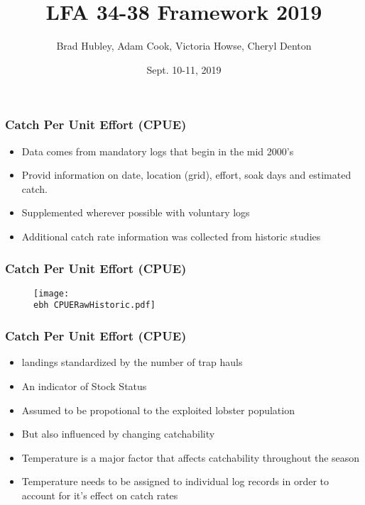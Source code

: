 \documentclass{beamer}
\title[LFA 34-38]{LFA 34-38 Framework 2019}
\author[Hubley, Cook, Howse and Denton]{Brad Hubley, Adam Cook, Victoria Howse, Cheryl Denton}
\institute[DFO]{Science Branch, Fisheries and Oceans Canada}
\date{Sept. 10-11, 2019}
\newcommand{\ebh}{\string~/bio.data/bio.lobster/figures/LFA3438Framework2019/} %
\begin{document}
 
\frame{\titlepage}
 




\begin{frame}
\frametitle{Catch Per Unit Effort (CPUE)}
\begin{itemize}
\item Data comes from mandatory logs that begin in the mid 2000’s
\item Provid information on date, location (grid), effort, soak days and estimated catch.
\item Supplemented wherever possible with voluntary logs
\item Additional catch rate information was collected from historic studies
\end{itemize}
\end{frame}


\begin{frame}
\frametitle{Catch Per Unit Effort (CPUE)}
\begin{figure}
        \begin{center}
            \texttt{[image: \\ebh CPUERawHistoric.pdf]}
        \end{center}
    \end{figure}
\end{frame}



\begin{frame}
\frametitle{Catch Per Unit Effort (CPUE)}
\begin{itemize}
\item landings standardized by the number of trap hauls 
\item An indicator of Stock Status 
\item Assumed to be propotional to the exploited lobster population 
\item But also influenced by changing catchability 
\item Temperature is a major factor that affects catchability throughout the season 
\item Temperature needs to be assigned to individual log records in order to account for it's effect on catch rates 
\end{itemize}
\end{frame}
\end{document}
